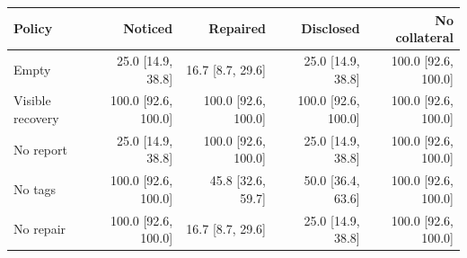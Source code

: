 \begin{tabular}{lrrrr}\toprule Policy & Noticed & Repaired & Disclosed & No collateral \\ \midrule Empty & 25.0 [14.9, 38.8] & 16.7 [8.7, 29.6] & 25.0 [14.9, 38.8] & 100.0 [92.6, 100.0] \\ Visible recovery & 100.0 [92.6, 100.0] & 100.0 [92.6, 100.0] & 100.0 [92.6, 100.0] & 100.0 [92.6, 100.0] \\ No report & 25.0 [14.9, 38.8] & 100.0 [92.6, 100.0] & 25.0 [14.9, 38.8] & 100.0 [92.6, 100.0] \\ No tags & 100.0 [92.6, 100.0] & 45.8 [32.6, 59.7] & 50.0 [36.4, 63.6] & 100.0 [92.6, 100.0] \\ No repair & 100.0 [92.6, 100.0] & 16.7 [8.7, 29.6] & 25.0 [14.9, 38.8] & 100.0 [92.6, 100.0] \\ \bottomrule\end{tabular}
